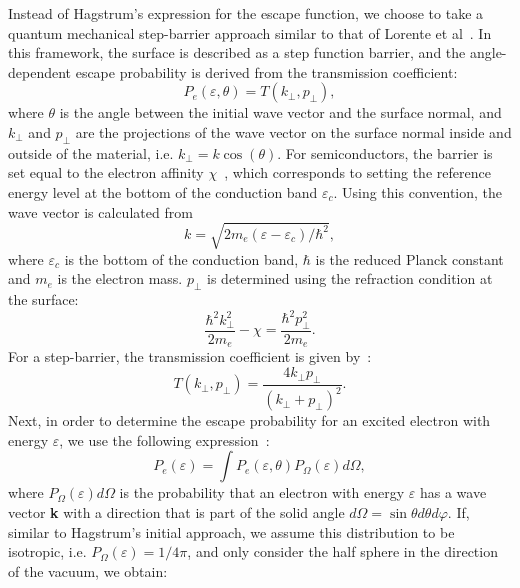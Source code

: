 \begin{refsection}
Instead of Hagstrum's expression for the escape function, we choose to take a quantum mechanical step-barrier approach similar to that of Lorente et al~\cite{Lorente1994}. In this framework, the surface is described as a step function barrier, and the angle-dependent escape probability is derived from the transmission coefficient:
\begin{equation}
P_e(\varepsilon, \theta) = T(k_\perp,p_\perp),
\end{equation}
where $\theta$ is the angle between the initial wave vector and the surface normal, and $k_\perp$ and $p_\perp$ are the projections of the wave vector on the surface normal inside and outside of the material, i.e. $k_\perp = k \cos(\theta)$. For semiconductors, the barrier is set equal to the electron affinity $\chi$~\cite{Baragiola1993, Aboelfotoh1977, Yoon2001}, which corresponds to setting the reference energy level at the bottom of the conduction band $\varepsilon_c$. Using this convention, the wave vector is calculated from
\begin{equation}\label{quotas:eq-wavevector}
k=\sqrt{2 m_e (\varepsilon - \varepsilon_c)/\hbar^2},
\end{equation}
where $\varepsilon_c$ is the bottom of the conduction band, $\hbar$ is the reduced Planck constant and $m_e$ is the electron mass. $p_\perp$ is determined using the refraction condition at the surface:
\begin{equation}\label{quotas:eq-refraction}
\frac{\hbar^2 k_\perp^2}{2 m_e} - \chi = \frac{\hbar^2 p_\perp^2}{2 m_e}.
\end{equation}
For a step-barrier, the transmission coefficient is given by~\cite{Lorente1994}:
\begin{equation}
T(k_\perp,p_\perp) = \frac{4k_\perp p_\perp}{(k_\perp + p_\perp)^2}.
\end{equation}
Next, in order to determine the escape probability for an excited electron with energy $\varepsilon$, we use the following expression~\cite{Hagstrum1954}:
\begin{equation}
P_e(\varepsilon) = \int P_e(\varepsilon,\theta) P_{\Omega}(\varepsilon) d\Omega,
\end{equation}
where $P_{\Omega}(\varepsilon)d\Omega$ is the probability that an electron with energy $\varepsilon$ has a wave vector \textbf{k} with a direction that is part of the solid angle $d\Omega = \sin{\theta} d\theta d\varphi$. If, similar to Hagstrum's initial approach, we assume this distribution to be isotropic, i.e. $P_{\Omega}(\varepsilon) = 1/4\pi$, and only consider the half sphere in the direction of the vacuum, we obtain:

\end{refsection}
